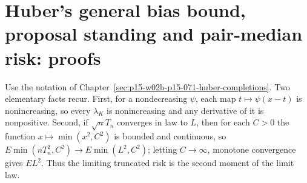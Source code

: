 \section{Huber's general bias bound, proposal standing and pair-median risk: proofs}
\label{sec:annex-p15-w02b-p15-071-huber-completions}

Use the notation of
Chapter~\ref{sec:p15-w02b-p15-071-huber-completions}. Two elementary
facts recur. First, for a nondecreasing \(\psi\), each map
\(t\mapsto\psi(x-t)\) is nonincreasing, so every \(\lambda_K\) is
nonincreasing and any derivative of it is nonpositive. Second, if
\(\sqrt nT_n\) converges in law to \(L\), then for each \(C>0\) the
function \(x\mapsto\min(x^2,C^2)\) is bounded and continuous, so
\(E\min(nT_n^2,C^2)\to E\min(L^2,C^2)\); letting \(C\to\infty\),
monotone convergence gives \(EL^2\). Thus the limiting truncated risk is
the second moment of the limit law.

